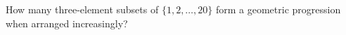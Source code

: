 How many three-element subsets of $\{1,2,\ldots,20\}$ form a geometric progression when arranged increasingly?

